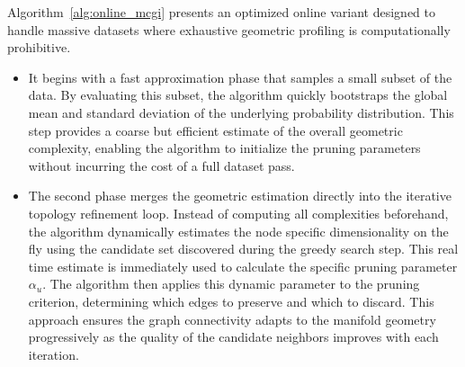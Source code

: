 \documentclass{article}
\theoremstyle{plain}
\theoremstyle{definition}
\theoremstyle{remark}
\begin{document}
Algorithm~\ref{alg:online_mcgi} presents an optimized online variant designed to handle massive datasets where exhaustive geometric profiling is computationally prohibitive. 
\begin{itemize}
    \item It begins with a fast approximation phase that samples a small subset of the data. By evaluating this subset, the algorithm quickly bootstraps the global mean and standard deviation of the underlying probability distribution. This step provides a coarse but efficient estimate of the overall geometric complexity, enabling the algorithm to initialize the pruning parameters without incurring the cost of a full dataset pass.
    \item The second phase merges the geometric estimation directly into the iterative topology refinement loop. Instead of computing all complexities beforehand, the algorithm dynamically estimates the node specific dimensionality on the fly using the candidate set discovered during the greedy search step. This real time estimate is immediately used to calculate the specific pruning parameter $\alpha_u$. The algorithm then applies this dynamic parameter to the pruning criterion, determining which edges to preserve and which to discard. This approach ensures the graph connectivity adapts to the manifold geometry progressively as the quality of the candidate neighbors improves with each iteration.
\end{itemize}
\end{document}
